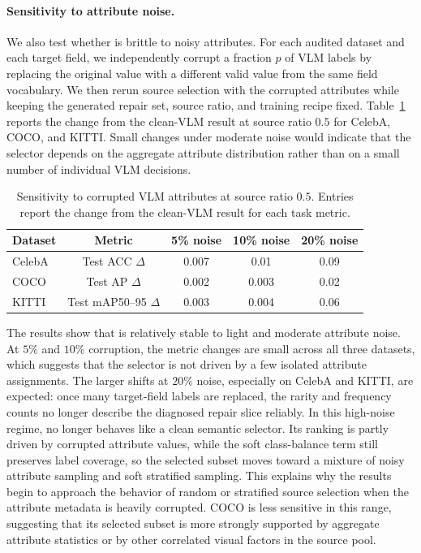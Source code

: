 \paragraph{Sensitivity to attribute noise.}
We also test whether \model is brittle to noisy attributes. For each audited dataset and each target field, we independently corrupt a fraction $p$ of VLM labels by replacing the original value with a different valid value from the same field vocabulary. We then rerun source selection with the corrupted attributes while keeping the generated repair set, source ratio, and training recipe fixed. Table~\ref{tab:attribute-noise-sensitivity} reports the change from the clean-VLM \model result at source ratio $0.5$ for CelebA, COCO, and KITTI. Small changes under moderate noise would indicate that the selector depends on the aggregate attribute distribution rather than on a small number of individual VLM decisions.

\begin{table}[h]
\centering
\caption{Sensitivity to corrupted VLM attributes at source ratio $0.5$. Entries report the change from the clean-VLM \model result for each task metric.}
\label{tab:attribute-noise-sensitivity}
\small
\setlength{\tabcolsep}{5pt}
\begin{tabular}{l c c c c}
\toprule
\rowcolor{sectiongray} \textbf{Dataset} & \textbf{Metric} & \textbf{5\% noise} & \textbf{10\% noise} & \textbf{20\% noise} \\
\midrule
CelebA & Test ACC $\Delta$ & 0.007 & 0.01 & 0.09 \\
COCO & Test AP $\Delta$ & 0.002 & 0.003 & 0.02 \\
KITTI & Test mAP50--95 $\Delta$ & 0.003 & 0.004 & 0.06 \\
\bottomrule
\end{tabular}
\end{table}

The results show that \model is relatively stable to light and moderate attribute noise. At $5\%$ and $10\%$ corruption, the metric changes are small across all three datasets, which suggests that the selector is not driven by a few isolated attribute assignments. The larger shifts at $20\%$ noise, especially on CelebA and KITTI, are expected: once many target-field labels are replaced, the rarity and frequency counts no longer describe the diagnosed repair slice reliably. In this high-noise regime, \model no longer behaves like a clean semantic selector. Its ranking is partly driven by corrupted attribute values, while the soft class-balance term still preserves label coverage, so the selected subset moves toward a mixture of noisy attribute sampling and soft stratified sampling. This explains why the results begin to approach the behavior of random or stratified source selection when the attribute metadata is heavily corrupted. COCO is less sensitive in this range, suggesting that its selected subset is more strongly supported by aggregate attribute statistics or by other correlated visual factors in the source pool.
